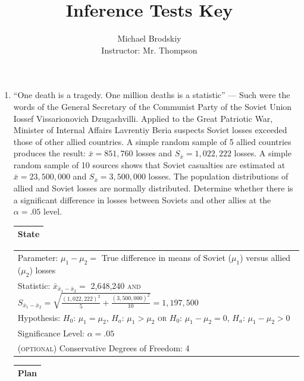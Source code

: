 \documentclass[12pt]{article}
\title{Inference Tests Key}
\author{Michael Brodskiy \\ \small Instructor: Mr. Thompson}
\date{}
\begin{document}
\maketitle

\begin{enumerate}

  \item “One death is a tragedy. One million deaths is a statistic” — Such were the words of the General Secretary of the Communist Party of the Soviet Union Iossef Vissarionovich Dzugashvilli. Applied to the Great Patriotic War, Minister of Internal Affairs Lavrentiy Beria suspects Soviet losses exceeded those of other allied countries. A simple random sample of 5 allied countries produces the result: $\bar{x} = 851,760$ losses and $S_{\bar{x}} = 1,022,222$ losses. A simple random sample of 10 sources shows that Soviet casualties are estimated at $\bar{x} = 23,500,000$ and $S_{\bar{x}} = 3,500,000$ losses. The population distributions of allied and Soviet losses are normally distributed. Determine whether there is a significant difference in losses between Soviets and other allies at the $\alpha = .05$ level.

        \begin{flushleft}
          \begin{tabular}{|c|}
            \hline
            \textbf{State}\\
            \hline
          \end{tabular}
        \end{flushleft}

        \begin{tabular}{l}

          Parameter: $\mu_1 - \mu_2=$ True difference in means of Soviet ($\mu_1$) versus allied ($\mu_2$) losses \\
          Statistic: $\bar{x}_{\bar{x}_1-\bar{x}_2}=$ 2,648,240 \textsc{and} $S_{\bar{x}_1-\bar{x}_2}=\sqrt{\frac{(1,022,222)^2}{5} + \frac{(3,500,000)^2}{10}}=1,197,500$\\
          Hypothesis: $H_0$: $\mu_1=\mu_2$, $H_a$: $\mu_1 > \mu_2$ \textsc{or} $H_0$: $\mu_1-\mu_2=0$, $H_a$: $\mu_1 - \mu_2 > 0$\\
          Significance Level: $\alpha = .05$\\
          (\textsc{optional}) Conservative Degrees of Freedom: 4

        \end{tabular}

        \begin{flushleft}
          \begin{tabular}{|c|}
            \hline
            \textbf{Plan}\\
            \hline
          \end{tabular}
        \end{flushleft}


\end{enumerate}
\end{document}
